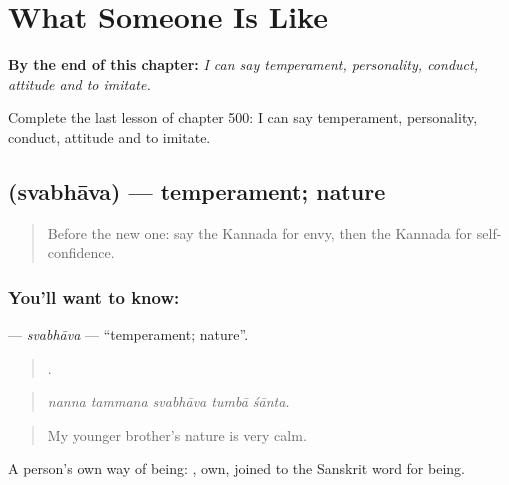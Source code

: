 
\chapter{What Someone Is Like}
\label{ch:ka-what-someone-is-like}

\begin{chapteropening}
\textbf{By the end of this chapter:} \emph{I can say temperament, personality, conduct, attitude and to imitate.}

Complete the last lesson of chapter 500: I can say temperament, personality, conduct, attitude and to imitate.
\end{chapteropening}

\section[\texorpdfstring{\kn{ಸ್ವಭಾವ} (svabhāva)}{ಸ್ವಭಾವ (svabhāva)}]{ (svabhāva) — temperament; nature}

\label{lesson:KA-C500-svabhava}



\begin{quote}
Before the new one: say the Kannada for envy, then the Kannada for self-confidence.
\end{quote}

\subsection*{You'll want to know: }
\textbf{} — \emph{svabhāva} — \textquotedblleft{}temperament; nature\textquotedblright{}.

\begin{quote}
    .
\end{quote}

\begin{quote}
\emph{nanna tammana svabhāva tumbā śānta.}
\end{quote}

\begin{quote}
My younger brother's nature is very calm.
\end{quote}

A person's own way of being: , own, joined to the Sanskrit word for being.

